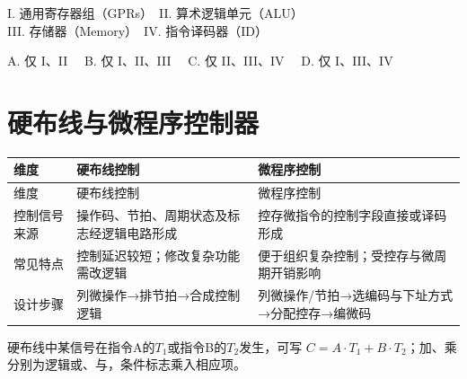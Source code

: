 I. 通用寄存器组（GPRs）　II. 算术逻辑单元（ALU）\\
III. 存储器（Memory）　IV. 指令译码器（ID）

A. 仅 I、II　 B. 仅 I、II、III　 C. 仅 II、III、IV　 D. 仅 I、III、IV

\section{硬布线与微程序控制器}\label{CO05-controller}

\par\smallskip
\begin{wideblock}
{\fontsize{9.3}{12}\selectfont\setlength{\tabcolsep}{2.5pt}\setlength{\LTleft}{0pt}\setlength{\LTright}{0pt}
\begin{longtable}{@{}>{\raggedright\arraybackslash}p{}>{\raggedright\arraybackslash}p{}>{\raggedright\arraybackslash}p{}@{}}
\toprule
维度 & 硬布线控制 & 微程序控制 \\

\midrule\endfirsthead\toprule
维度 & 硬布线控制 & 微程序控制 \\

\midrule\endhead\bottomrule\endfoot
控制信号来源 & 操作码、节拍、周期状态及标志经逻辑电路形成 & 控存微指令的控制字段直接或译码形成 \\

常见特点 & 控制延迟较短；修改复杂功能需改逻辑 & 便于组织复杂控制；受控存与微周期开销影响 \\

设计步骤 & 列微操作→排节拍→合成控制逻辑 & 列微操作/节拍→选编码与下址方式→分配控存→编微码 \\

\end{longtable}}
\end{wideblock}
\par\smallskip

硬布线中某信号在指令A的\(T_1\)或指令B的\(T_2\)发生，可写 \(C=A\cdot T_1+B\cdot T_2\)；加、乘分别为逻辑或、与，条件标志乘入相应项。

